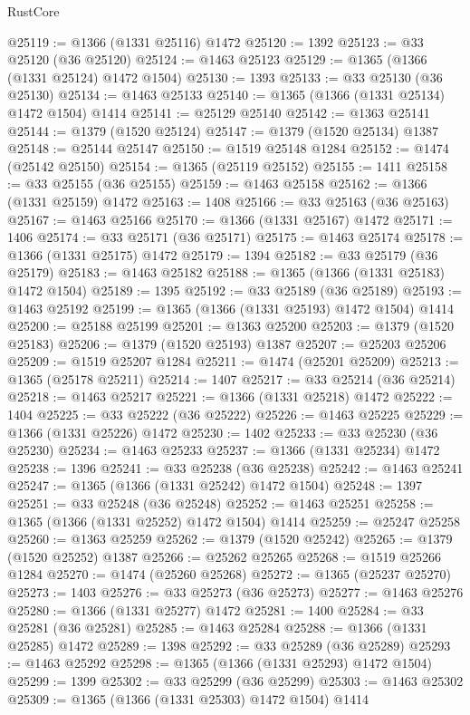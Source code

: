\begin{lexlean}{RustCore}
\begin{coremodule}
@25119 := @1366 (@1331 @25116) @1472
@25120 := 1392
@25123 := @33 @25120 (@36 @25120)
@25124 := @1463 @25123
@25129 := @1365 (@1366 (@1331 @25124) @1472 @1504)
@25130 := 1393
@25133 := @33 @25130 (@36 @25130)
@25134 := @1463 @25133
@25140 := @1365 (@1366 (@1331 @25134) @1472 @1504) @1414
@25141 := @25129 @25140
@25142 := @1363 @25141
@25144 := @1379 (@1520 @25124)
@25147 := @1379 (@1520 @25134) @1387
@25148 := @25144 @25147
@25150 := @1519 @25148 @1284
@25152 := @1474 (@25142 @25150)
@25154 := @1365 (@25119 @25152)
@25155 := 1411
@25158 := @33 @25155 (@36 @25155)
@25159 := @1463 @25158
@25162 := @1366 (@1331 @25159) @1472
@25163 := 1408
@25166 := @33 @25163 (@36 @25163)
@25167 := @1463 @25166
@25170 := @1366 (@1331 @25167) @1472
@25171 := 1406
@25174 := @33 @25171 (@36 @25171)
@25175 := @1463 @25174
@25178 := @1366 (@1331 @25175) @1472
@25179 := 1394
@25182 := @33 @25179 (@36 @25179)
@25183 := @1463 @25182
@25188 := @1365 (@1366 (@1331 @25183) @1472 @1504)
@25189 := 1395
@25192 := @33 @25189 (@36 @25189)
@25193 := @1463 @25192
@25199 := @1365 (@1366 (@1331 @25193) @1472 @1504) @1414
@25200 := @25188 @25199
@25201 := @1363 @25200
@25203 := @1379 (@1520 @25183)
@25206 := @1379 (@1520 @25193) @1387
@25207 := @25203 @25206
@25209 := @1519 @25207 @1284
@25211 := @1474 (@25201 @25209)
@25213 := @1365 (@25178 @25211)
@25214 := 1407
@25217 := @33 @25214 (@36 @25214)
@25218 := @1463 @25217
@25221 := @1366 (@1331 @25218) @1472
@25222 := 1404
@25225 := @33 @25222 (@36 @25222)
@25226 := @1463 @25225
@25229 := @1366 (@1331 @25226) @1472
@25230 := 1402
@25233 := @33 @25230 (@36 @25230)
@25234 := @1463 @25233
@25237 := @1366 (@1331 @25234) @1472
@25238 := 1396
@25241 := @33 @25238 (@36 @25238)
@25242 := @1463 @25241
@25247 := @1365 (@1366 (@1331 @25242) @1472 @1504)
@25248 := 1397
@25251 := @33 @25248 (@36 @25248)
@25252 := @1463 @25251
@25258 := @1365 (@1366 (@1331 @25252) @1472 @1504) @1414
@25259 := @25247 @25258
@25260 := @1363 @25259
@25262 := @1379 (@1520 @25242)
@25265 := @1379 (@1520 @25252) @1387
@25266 := @25262 @25265
@25268 := @1519 @25266 @1284
@25270 := @1474 (@25260 @25268)
@25272 := @1365 (@25237 @25270)
@25273 := 1403
@25276 := @33 @25273 (@36 @25273)
@25277 := @1463 @25276
@25280 := @1366 (@1331 @25277) @1472
@25281 := 1400
@25284 := @33 @25281 (@36 @25281)
@25285 := @1463 @25284
@25288 := @1366 (@1331 @25285) @1472
@25289 := 1398
@25292 := @33 @25289 (@36 @25289)
@25293 := @1463 @25292
@25298 := @1365 (@1366 (@1331 @25293) @1472 @1504)
@25299 := 1399
@25302 := @33 @25299 (@36 @25299)
@25303 := @1463 @25302
@25309 := @1365 (@1366 (@1331 @25303) @1472 @1504) @1414

\end{coremodule}
\end{lexlean}
